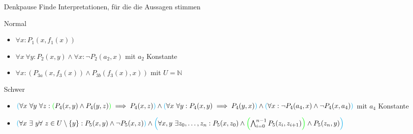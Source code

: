 {
\begin{frame}{Denkpause}
	Finde Interpretationen, für die die Aussagen stimmen
	\begin{block}{Normal}
		\begin{itemize}
			\item $\forall x: {P_1(x,f_1(x))}$
			\item $\forall x\ \forall y : P_2(x,y)\land \forall x : \lnot P_2(a_2,x)$ mit $a_2$ Konstante
			\item $\forall x : \left(P_{3a}(x,f_3(x))\land P_{3b}(f_3(x),x)\right)$ mit $U=\mathbb{N}$ %
		\end{itemize}
	\end{block}
	\begin{block}{Schwer}
		\begin{itemize}
			\item $\cleft[cyan](
				      \forall x\ \forall y\ \forall z :
				      \cleft[green](
				      P_4(x,y) \land P_4(y,z)
				      \cright[green])
				      \implies P_4(x,z)
				      \cright[cyan])
				      \land
				      \cleft[cyan](
				      \forall x\ \forall y : P_4(x,y) \implies P_4(y,x)
				      \cright[cyan])
				      \land
				      \cleft[cyan](
				      \forall x : \lnot P_4(a_4, x) \land \lnot P_4(x, a_4)
				      \cright[cyan])$
			      mit $a_4$ Konstante
			\item $\cleft[cyan](
				      \forall x\ \exists\ y \forall\ z \in U\setminus\{y\} : P_5(x,y)\land\lnot P_5(x,z)
				      \cright[cyan])
				      \land
				      \cleft[cyan](
				      \forall x,y\ \exists z_0,\dots,z_n : P_5(x,z_0) \land \cleft[green](
				      \bigwedge_{i=0}^{n-1} P_5(z_i,z_{i+1})
				      \cright[green])
				      \land P_5(z_n,y)
				      \cright[cyan])$
		\end{itemize}
	\end{block}
\end{frame}

}
